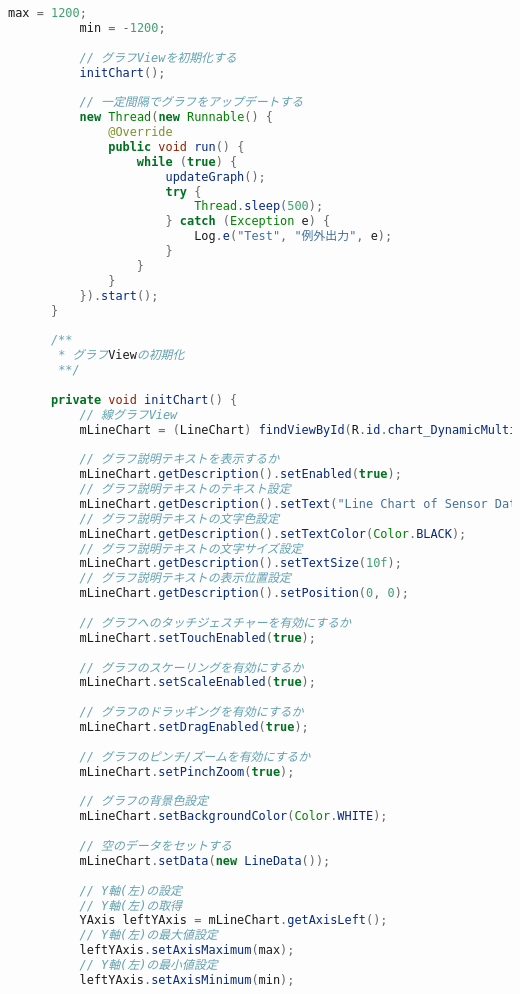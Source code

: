 \documentclass[dvipdfmx,autodetect-engine,titlepage]{jsarticle}
\begin{document}
\begin{lstlisting}[language=java]
          max = 1200;
          min = -1200;
  
          // グラフViewを初期化する
          initChart();
  
          // 一定間隔でグラフをアップデートする
          new Thread(new Runnable() {
              @Override
              public void run() {
                  while (true) {
                      updateGraph();
                      try {
                          Thread.sleep(500);
                      } catch (Exception e) {
                          Log.e("Test", "例外出力", e);
                      }
                  }
              }
          }).start();
      }
  
      /**
       * グラフViewの初期化
       **/
  
      private void initChart() {
          // 線グラフView
          mLineChart = (LineChart) findViewById(R.id.chart_DynamicMultiLineGraph);
  
          // グラフ説明テキストを表示するか
          mLineChart.getDescription().setEnabled(true);
          // グラフ説明テキストのテキスト設定
          mLineChart.getDescription().setText("Line Chart of Sensor Data");
          // グラフ説明テキストの文字色設定
          mLineChart.getDescription().setTextColor(Color.BLACK);
          // グラフ説明テキストの文字サイズ設定
          mLineChart.getDescription().setTextSize(10f);
          // グラフ説明テキストの表示位置設定
          mLineChart.getDescription().setPosition(0, 0);
  
          // グラフへのタッチジェスチャーを有効にするか
          mLineChart.setTouchEnabled(true);
  
          // グラフのスケーリングを有効にするか
          mLineChart.setScaleEnabled(true);
  
          // グラフのドラッギングを有効にするか
          mLineChart.setDragEnabled(true);
  
          // グラフのピンチ/ズームを有効にするか
          mLineChart.setPinchZoom(true);
  
          // グラフの背景色設定
          mLineChart.setBackgroundColor(Color.WHITE);
  
          // 空のデータをセットする
          mLineChart.setData(new LineData());
  
          // Y軸(左)の設定
          // Y軸(左)の取得
          YAxis leftYAxis = mLineChart.getAxisLeft();
          // Y軸(左)の最大値設定
          leftYAxis.setAxisMaximum(max);
          // Y軸(左)の最小値設定
          leftYAxis.setAxisMinimum(min);
  

\end{lstlisting}
\end{document}
